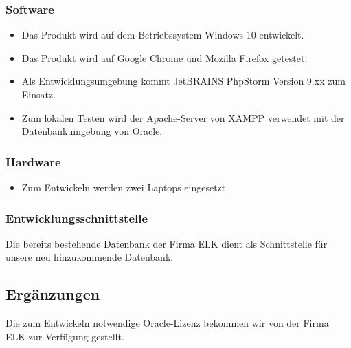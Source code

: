 \subsubsection{Software}
\begin{itemize}
\item Das Produkt wird auf dem Betriebssystem Windows 10 entwickelt. 
\item Das Produkt wird auf Google Chrome und Mozilla Firefox getestet. 
\item Als Entwicklungsumgebung kommt JetBRAINS PhpStorm Version 9.xx zum
Einsatz. 
\item Zum lokalen Testen wird der Apache-Server von XAMPP verwendet mit
der Datenbankumgebung von Oracle. 
\end{itemize}

\subsubsection{Hardware}
\begin{itemize}
\item Zum Entwickeln werden zwei Laptops eingesetzt. 
\end{itemize}

\subsubsection{Entwicklungsschnittstelle}

Die bereits bestehende Datenbank der Firma ELK dient als Schnittstelle
für unsere neu hinzukommende Datenbank.


\subsection{Ergänzungen}

Die zum Entwickeln notwendige Oracle-Lizenz bekommen wir von der Firma
ELK zur Verfügung gestellt. 

\newpage
